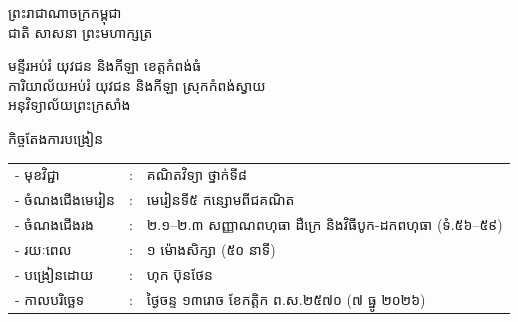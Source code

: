 \documentclass[a4paper,10pt]{article}
\newcommand{\khmflourish}{{\Tacteing\fontsize{36pt}{14pt}\selectfont\raisebox{-5pt}{3}}}
\begin{document}
\fontsize{10pt}{15.2pt}\selectfont

\begin{center}
  {\muol\fontsize{11pt}{16pt}\selectfont ព្រះរាជាណាចក្រកម្ពុជា}\\[2pt]
  {\muol\fontsize{10pt}{15pt}\selectfont ជាតិ សាសនា ព្រះមហាក្សត្រ}\\[1pt]
  \khmflourish
\end{center}

\vspace{-28pt}
{\muol\fontsize{9.5pt}{12.5pt}\selectfont
មន្ទីរអប់រំ យុវជន និងកីឡា ខេត្តកំពង់ធំ\\
ការិយាល័យអប់រំ យុវជន និងកីឡា ស្រុកកំពង់ស្វាយ\\
អនុវិទ្យាល័យព្រះក្រសាំង}

\vspace{1pt}
\begin{center}
  {\muol\fontsize{10pt}{14pt}\selectfont កិច្ចតែងការបង្រៀន}
\end{center}
\vspace{0pt}

{\renewcommand{\arraystretch}{0.95}
\hspace*{4.05cm}%
\begin{tabular}{@{}l l l@{}}
  - \hspace{0.35cm} មុខវិជ្ជា & : & គណិតវិទ្យា ថ្នាក់ទី៨ \\
  - \hspace{0.35cm} ចំណងជើងមេរៀន & : & មេរៀនទី៥ កន្សោមពីជគណិត \\
  - \hspace{0.35cm} ចំណងជើងរង & : & ២.១--២.៣ សញ្ញាណពហុធា ដឺក្រេ និងវិធីបូក-ដកពហុធា (ទំ.៥៦--៥៩) \\
  - \hspace{0.35cm} រយៈពេល & : & ១ ម៉ោងសិក្សា (៥០ នាទី) \\
  - \hspace{0.35cm} បង្រៀនដោយ & : & ហុក ប៊ុនថែន \\
  - \hspace{0.35cm} កាលបរិច្ឆេទ & : & ថ្ងៃចន្ទ ១៣រោច ខែកត្តិក ព.ស.២៥៧០ (៧ ធ្នូ ២០២៦) \\
\end{tabular}
}

\vspace{1pt}
\end{document}
